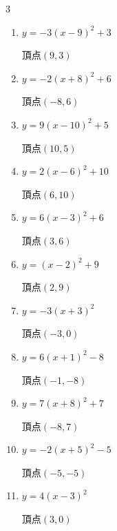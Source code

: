\begin{multicols}{3}
\begin{enumerate}
        $\displaystyle 頂点\left( -2 , -9 \right)$

  \item $\displaystyle y=-3\left( x-9\right)^{2}+3$

        $\displaystyle 頂点\left( 9 , 3 \right)$

\columnbreak %

\resetques

  \item $\displaystyle y=-2\left( x+8\right)^{2}+6$

        $\displaystyle 頂点\left( -8 , 6 \right)$

  \item $\displaystyle y=9\left( x-10\right)^{2}+5$

        $\displaystyle 頂点\left( 10 , 5 \right)$

  \item $\displaystyle y=2\left( x-6\right)^{2}+10$

        $\displaystyle 頂点\left( 6 , 10 \right)$

  \item $\displaystyle y=6\left( x-3\right)^{2}+6$

        $\displaystyle 頂点\left( 3 , 6 \right)$

  \item $\displaystyle y=\left( x-2\right)^{2}+9$

        $\displaystyle 頂点\left( 2 , 9 \right)$

  \item $\displaystyle y=-3\left( x+3\right)^{2}$

        $\displaystyle 頂点\left( -3 , 0 \right)$

  \item $\displaystyle y=6\left( x+1\right)^{2}-8$

        $\displaystyle 頂点\left( -1 , -8 \right)$

  \item $\displaystyle y=7\left( x+8\right)^{2}+7$

        $\displaystyle 頂点\left( -8 , 7 \right)$

  \item $\displaystyle y=-2\left( x+5\right)^{2}-5$

        $\displaystyle 頂点\left( -5 , -5 \right)$

  \item $\displaystyle y=4\left( x-3\right)^{2}$

        $\displaystyle 頂点\left( 3 , 0 \right)$


\end{enumerate}
\end{multicols}

